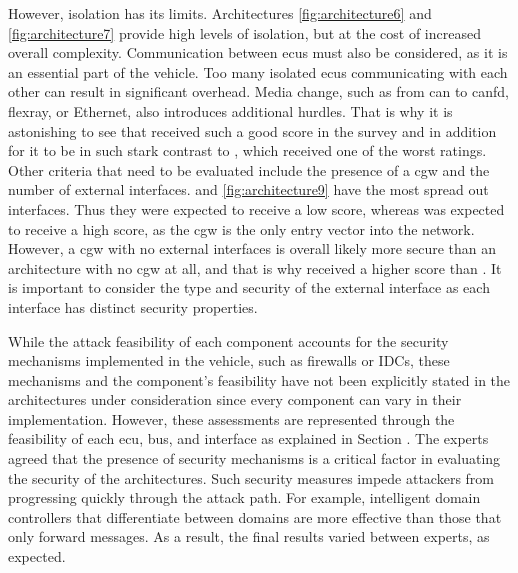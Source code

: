 However, isolation has its limits.
Architectures \ref{fig:architecture6} and \ref{fig:architecture7} provide high levels of isolation, but at the cost of increased overall complexity.
Communication between \acrshort{ecu}s must also be considered, as it is an essential part of the vehicle. 
Too many isolated \acrshort{ecu}s communicating with each other can result in significant overhead. 
Media change, such as from \acrshort{can} to \acrshort{canfd}, \acrshort{flexray}, or Ethernet, also introduces additional hurdles.
That is why it is astonishing to see that  received such a good score in the survey
and in addition for it to be in such stark contrast to , which received one of the worst ratings.\\

Other criteria that need to be evaluated include the presence of a \acrshort{cgw} and the number of external interfaces. 
 and \ref{fig:architecture9} have the most spread out interfaces. 
Thus they were expected to receive a low score, whereas  was expected to receive a high score, as the \acrshort{cgw} is the only entry vector into the network.
However, a \acrshort{cgw} with no external interfaces is overall likely more secure than an architecture with no \acrshort{cgw} at all, and that is why 
 received a higher score than . 
It is important to consider the type and security of the external interface as each interface has distinct security properties.

While the attack feasibility of each component accounts for the security mechanisms implemented in the vehicle, such as firewalls or IDCs, 
these mechanisms and the component's feasibility have not been explicitly stated in the architectures under consideration since every component can vary in their implementation.
However, these assessments are represented through the feasibility of each \acrshort{ecu}, bus, and interface as explained in Section .
The experts agreed that the presence of security mechanisms is a critical factor in evaluating the security of the architectures.
Such security measures impede attackers from progressing quickly through the attack path. 
For example, intelligent domain controllers that differentiate between domains are more effective than those that only forward messages.
As a result, the final results varied between experts, as expected.\\

